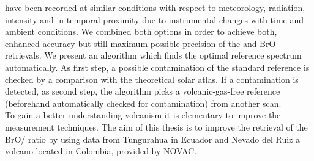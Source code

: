 have been recorded at similar conditions with respect to meteorology,
radiation, intensity and in temporal proximity due to instrumental changes
with time and ambient conditions. We combined both options in order to
achieve both, enhanced accuracy but still maximum possible precision of
the  and BrO retrievals. We present an algorithm which finds the
optimal reference spectrum automatically. As first step, a possible 
contamination of the standard reference is checked by a comparison with
the theoretical solar atlas. If a contamination is detected, as second step,
the algorithm picks a volcanic-gas-free reference (beforehand
automatically checked for contamination) from another scan.\\
%
\newline
%
To gain a better understanding volcanism it is elementary to improve the measurement techniques. The aim of this thesis is to improve the retrieval of the BrO/ ratio by using data from Tungurahua in Ecuador and Nevado del Ruiz a volcano located in Colombia, provided by NOVAC.



















